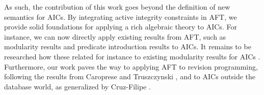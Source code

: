 \documentclass[runningheads]{llncs}
\begin{document}
{%

As such, the contribution of this work goes beyond the definition of new semantics for AICs. 
By integrating active integrity constraints in AFT, we provide solid foundations for applying a rich algebraic theory to AICs.
For instance, we can now directly apply existing results from AFT, such as modularity results and predicate introduction results to AICs. 
It remains to be researched how these related for instance to existing modularity results for AICs \cite{foiks/Cruz-Filipe14,iclp/Cruz-Filipe16}. 
Furthermore, our work paves the way to applying AFT to revision programming, following the results from Caroprese and Truszczynski \cite{tplp/CaropreseT11}, and to AICs outside the database world, as generalized by Cruz-Filipe \cite{ekaw/Cruz-Filipe16}.


}
\end{document}
